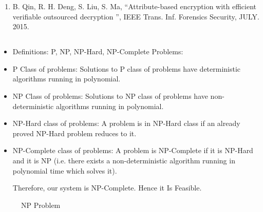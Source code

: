 \documentclass[oneside,a4paper,12pt]{report}
\begin{document}
{\begin{enumerate}
\item B. Qin, R. H. Deng, S. Liu, S. Ma, “Attribute-based encryption with efficient verifiable outsourced decryption ”, IEEE Trans. Inf. Forensics Security, JULY. 2015.

\end{enumerate}

\begin{appendices}
\chapter{}
\begin{itemize}

\item Definitions: P, NP, NP-Hard, NP-Complete Problems:

\item P Class of problems: Solutions to P class of problems have  deterministic algorithms running  in polynomial.
\item NP Class of problems: Solutions to NP class of problems have non-deterministic algorithms running in polynomial.
\item NP-Hard class of problems: A problem is in NP-Hard class if an already proved NP-Hard problem reduces to it.
\item NP-Complete class of problems: A problem is NP-Complete if it is NP-Hard and it is NP  (i.e. there exists a non-deterministic algorithm running in polynomial time which solves it).

Therefore, our system is NP-Complete. Hence it Is Feasible.

\end{itemize}

\begin{center}
	\begin{figure}[!htbp]
		\centering
   	    \caption{NP Problem}
	    \label{fig:NP Problem}
	\end{figure}
\end{center}


\end{appendices}}
\end{document}
